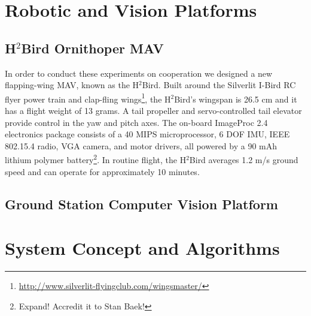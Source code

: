 \documentclass{aamas2013}
\begin{document}
\section{Robotic and Vision Platforms}

\subsection{H$^2$Bird Ornithoper MAV}
In order to conduct these experiments on cooperation we designed a new
flapping-wing MAV, known as the H$^2$Bird. Built around the Silverlit I-Bird 
RC flyer power train and clap-fling wings\footnote{\url{http://www.silverlit-flyingclub.com/wingsmaster/}}, 
the H$^2$Bird's wingspan is 26.5 cm and it has a flight weight of 13 grams. A tail propeller and 
servo-controlled tail elevator provide control in the yaw and pitch axes. The 
on-board ImageProc 2.4 electronics package consists of a 40 MIPS microprocessor, 
6 DOF IMU, IEEE 802.15.4 radio, VGA camera, and motor drivers, all powered by 
a 90 mAh lithium polymer battery\footnote{Expand! Accredit it to Stan Baek!}. In routine flight, the H$^2$Bird 
averages 1.2 m/s ground speed and can operate for approximately 10 minutes.

\subsection{Ground Station Computer Vision Platform}

\section{System Concept and Algorithms}
\end{document}
